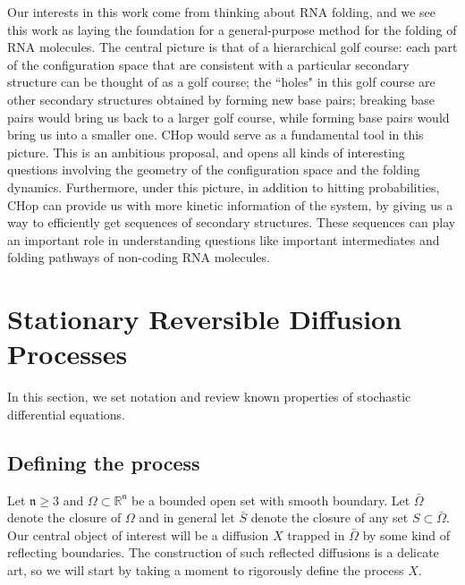 \documentclass[english, aip, jcp, priprint, graphicx,floatfix]{revtex4-1}
\theoremstyle{plain}
\theoremstyle{definition}
\theoremstyle{plain}
\newcommand{\dimension}{{\mathfrak{n}}}
\begin{document}
Our interests in this work come from thinking about RNA folding, and we see this work as laying the foundation for a general-purpose method for the folding of RNA molecules. The central picture is that of a hierarchical golf course: each part of the configuration space that are consistent with a particular secondary structure can be thought of as a golf course; the ``holes" in this golf course are other secondary structures obtained by forming new base pairs; breaking base pairs would bring us back to a larger golf course, while forming base pairs would bring us into a smaller one. CHop would serve as a fundamental tool in this picture. This is an ambitious proposal, and opens all kinds of interesting questions involving the geometry of the configuration space and the folding dynamics. Furthermore, under this picture, in addition to hitting probabilities, CHop can provide us with more kinetic information of the system, by giving us a way to efficiently get sequences of secondary structures. These sequences can play an important role in understanding questions like important intermediates and folding pathways of non-coding RNA molecules.

\newpage

\appendix

                                                         


\section{Stationary Reversible Diffusion Processes}\label{sec:reversible_diffusion}

In this section, we set notation and review known properties of stochastic differential equations.   

\subsection{Defining the process}

Let $\dimension \geq 3$ and $\Omega \subset \mathbb{R}^\dimension$ be a bounded open set with smooth boundary.  Let $\bar \Omega$ denote the closure of $\Omega$ and in general let $\bar S$ denote the closure of any set $S\subset \bar \Omega$.  Our central object of interest will be a diffusion $X$ trapped in $\bar \Omega$ by some kind of reflecting boundaries.  The construction of such reflected diffusions is a delicate art, so we will start by taking a moment to rigorously define the process $X$.
\end{document}
